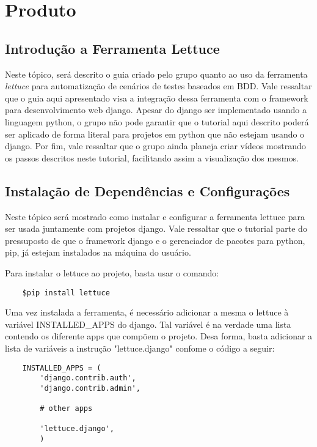 \chapter{Produto}\label{produto}

\section{Introdução a Ferramenta Lettuce}

    Neste tópico, será descrito o guia criado pelo grupo quanto ao uso da
    ferramenta \textit{lettuce} para automatização de cenários de testes
    baseados em BDD. Vale ressaltar que o guia aqui apresentado visa a
    integração dessa ferramenta com o framework para desenvolvimento web django.
    Apesar do django ser implementado usando a linguagem python, o grupo não
    pode garantir que o tutorial aqui descrito poderá ser aplicado de forma
    literal para projetos em python que não estejam usando o django. Por fim,
    vale ressaltar que o grupo ainda planeja criar vídeos mostrando os passos
    descritos neste tutorial, facilitando assim a visualização dos mesmos.

\section{Instalação de Dependências e Configurações}

    Neste tópico será mostrado como instalar e configurar a ferramenta lettuce
    para ser usada juntamente com projetos django. Vale ressaltar que o
    tutorial parte do pressuposto de que o framework django e o gerenciador de
    pacotes para python, pip, já estejam instalados na máquina do usuário.

    Para instalar o lettuce ao projeto, basta usar o comando:

    \begin{verbatim}
    $pip install lettuce
    \end{verbatim}
    
    Uma vez instalada a ferramenta, é necessário adicionar a mesma o lettuce à
    variável INSTALLED\_APPS do django. Tal variável é na verdade uma lista
    contendo os diferente apps que compõem o projeto. Desa forma, basta
    adicionar a lista de variáveis a instrução "lettuce.django" confome o código
    a seguir:

    \begin{verbatim}
    INSTALLED_APPS = (
        'django.contrib.auth',
        'django.contrib.admin',

        # other apps

        'lettuce.django',
        )
    \end{verbatim}

